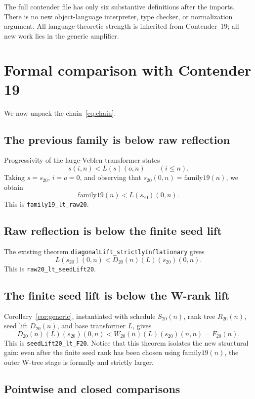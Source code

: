 \documentclass[11pt]{article}
\theoremstyle{definition}
\theoremstyle{remark}
\newcommand{\code}[1]{\texttt{#1}}
\begin{document}
The full contender file has only six substantive definitions after the imports.
There is no new object-language interpreter, type checker, or normalization
argument.  All language-theoretic strength is inherited from Contender~19; all
new work lies in the generic amplifier.

\section{Formal comparison with Contender 19}

We now unpack the chain~\eqref{eq:chain}.

\subsection{The previous family is below raw reflection}

Progressivity of the large-Veblen transformer states
\[
s(i,n)<L(s)(o,n)\qquad(i\le n).
\]
Taking \(s=s_{20}\), \(i=o=0\), and observing that
\(s_{20}(0,n)=\mathrm{family19}(n)\), we obtain
\[
\mathrm{family19}(n)<L(s_{20})(0,n).
\]
This is \code{family19\_lt\_raw20}.

\subsection{Raw reflection is below the finite seed lift}

The existing theorem \code{diagonalLift\_strictlyInflationary} gives
\[
L(s_{20})(0,n)<D_{20}(n)(L)(s_{20})(0,n).
\]
This is \code{raw20\_lt\_seedLift20}.

\subsection{The finite seed lift is below the W-rank lift}

Corollary~\ref{cor:generic}, instantiated with schedule \(S_{20}(n)\), rank
tree \(R_{20}(n)\), seed lift \(D_{20}(n)\), and base transformer \(L\), gives
\[
D_{20}(n)(L)(s_{20})(0,n)
<W_{20}(n)(L)(s_{20})(n,n)=F_{20}(n).
\]
This is \code{seedLift20\_lt\_F20}.  Notice that this theorem isolates the new
structural gain: even after the finite seed rank has been chosen using
\(\mathrm{family19}(n)\), the outer W-tree stage is formally and strictly
larger.

\subsection{Pointwise and closed comparisons}
\end{document}
